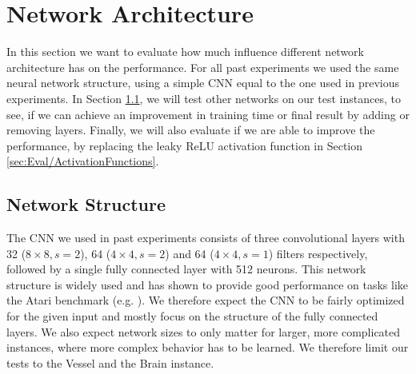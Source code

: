 \section{Network Architecture} \label{sec:EvalNetworks}
In this section we want to evaluate how much influence different network architecture has on the performance. For all past experiments we used the same neural network structure, using a simple CNN equal to the one used in previous experiments. In Section \ref{sec:Eval/NetworkStructure}, we will test other networks on our test instances, to see, if we can achieve an improvement in training time or final result by adding or removing layers. Finally, we will also evaluate if we are able to improve the performance, by replacing the leaky ReLU activation function in Section \ref{sec:Eval/ActivationFunctions}.

\subsection{Network Structure} \label{sec:Eval/NetworkStructure}
The CNN we used in past experiments consists of three convolutional layers with 32 ($8 \times 8, s=2$), 64 ($4\times4, s=2$) and 64 ($4 \times 4, s=1$) filters respectively, followed by a single fully connected layer with 512 neurons. This network structure is widely used and has shown to provide good performance on tasks like the Atari benchmark (e.g. \cite{burda2018large, burda2018exploration, mnih2015human}). We therefore expect the CNN to be fairly optimized for the given input and mostly focus on the structure of the fully connected layers. We also expect network sizes to only matter for larger, more complicated instances, where more complex behavior has to be learned. We therefore limit our tests to the Vessel and the Brain instance.


